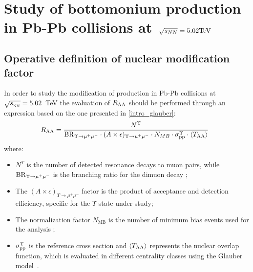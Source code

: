 
\chapter{Study of bottomonium production in Pb-Pb collisions at$\ $ \texorpdfstring{$\sqrt[]{s_{NN}}=5.02 \rm{TeV}$}{sqrt(Snn)=5.02\ \rm{TeV}}}

\section{Operative definition of nuclear modification factor}
In order to study the modification of \upsi production in Pb-Pb collisions at $\sqrt{s_{_{\rm NN}}}=5.02$~\rm{TeV} the evaluation of $R_{\rm AA}$ should be performed through an expression based on the one presented in \ref{intro_glauber}:
\begin{equation} \label{eqn:raa}
R_{\rm{AA}} = \frac{N^{\Upsilon}}{ {\rm BR}_{\Upsilon \rightarrow \mu^{+} \mu^{-}} \cdot  (A\times\epsilon)_{\Upsilon \rightarrow \mu^{+} \mu^{-}} \cdot  N_{MB} \cdot \sigma_{\rm pp}^{\Upsilon} \cdot \langle T_{\rm AA} \rangle } ~~
\end{equation}
where:
\begin{itemize}
\item $N^{\Upsilon}$ is the number of detected resonance decays to muon pairs, while ${\rm BR}_{\Upsilon \rightarrow \mu^{+} \mu^{-}}$ is the branching ratio for the dimuon decay \cite{Agashe:2014kda};
\item The $(A\times\epsilon)_{\Upsilon \rightarrow \mu^{+} \mu^{-}}$ factor is the product of acceptance and detection efficiency, specific for the $\Upsilon$ state under study;
\item The normalization factor $N_{\text{MB}}$ is the number of minimum bias events used for the analysis ;
\item $\sigma_{\rm pp}^{\Upsilon}$ is the reference \pp cross section and $\langle T_{\rm AA} \rangle$ represents the nuclear overlap function, which is evaluated in different centrality classes using the Glauber model~\cite{Abelev:2013qoq,Adam:2015ptt}.
\end{itemize}

